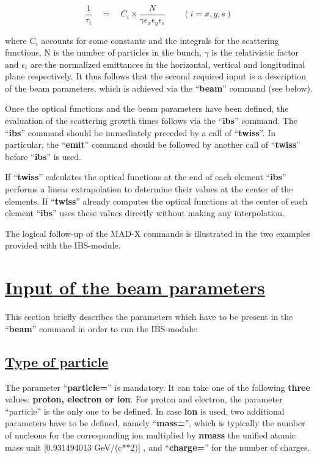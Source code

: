 {%

\[
 \frac{1}{\tau_i} \quad = \quad C_i \times \frac{N}{\gamma \epsilon_x \epsilon_y \epsilon_s} \qquad (i = x, y, s)
 \]


{  where C$_i$ accounts for some constants and the integrals for the scattering functions, N is the number of particles in the bunch, $\gamma$ is the relativistic factor and $\epsilon_i$ are the normalized emittances in the horizontal, vertical and longitudinal plane respectively. It thus follows that the second required input is a description of the beam parameters, which is achieved via the ``\textbf{beam}'' command (see below). }

{ Once the optical functions and the beam parameters have been defined, the evaluation of the scattering growth times follows via the ``\textbf{ibs}'' command.  The ``\textbf{ibs}'' command should be immediately preceded by a call of ``\textbf{twiss}''. In particular, the ``\textbf{emit}'' command should be followed by another call of ``\textbf{twiss}'' before ``\textbf{ibs}'' is used.     

 If ``\textbf{twiss}'' calculates the optical functions at the end of each element ``\textbf{ibs}'' performs a linear extrapolation to determine their values  at the center of the elements. If ``\textbf{twiss}'' already computes the optical functions at the center of each element ``\textbf{ibs}'' uses these  values directly without making any interpolation.  

  The logical follow-up of the MAD-X commands is illustrated in the two examples provided with the IBS-module. }



\section{\href{SECTION00010000000000000000}{ Input of the beam parameters}}{  This section briefly describes the parameters which have to be present in the  ``\textbf{beam}'' command in order to run the IBS-module: }



\subsection{\href{SECTION00011000000000000000}{ Type of particle}}{  The parameter ``\textbf{particle=}'' is mandatory. It can take one of the following \textbf{three} values: \textbf{proton, electron or ion}. For proton and electron, the parameter ``particle'' is the only one to be defined. In case \textbf{ion} is used, two additional parameters have to be defined, namely ``\textbf{mass=}'', which is typically the number of nucleons for the corresponding ion multiplied by \textbf{nmass} the unified atomic mass unit [0.931494013 GeV/(c**2)] , and ``\textbf{charge=}'' for the number of charges.  

}}
